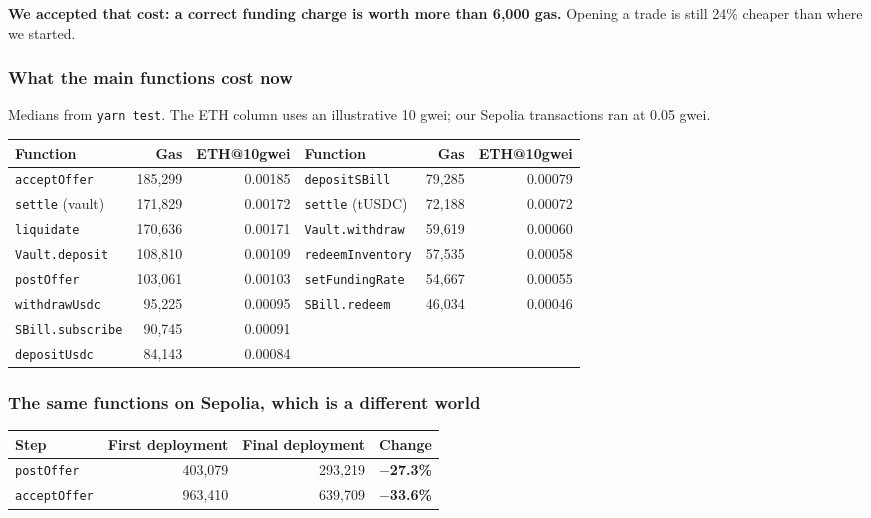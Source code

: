 \documentclass[11pt,a4paper]{article}
\begin{document}
\textbf{We accepted that cost: a correct funding charge is worth more than 6,000 gas.} Opening a
trade is still 24\% cheaper than where we started.

\subsubsection*{What the main functions cost now}

Medians from \texttt{yarn test}. The ETH column uses an illustrative 10 gwei; our Sepolia
transactions ran at 0.05 gwei.

\begin{center}
\small
\begin{tabular}{@{}lrr|lrr@{}}
\toprule
\textbf{Function} & \textbf{Gas} & \textbf{ETH@10gwei} & \textbf{Function} & \textbf{Gas} & \textbf{ETH@10gwei} \\
\midrule
\texttt{acceptOffer} & 185,299 & 0.00185 & \texttt{depositSBill} & 79,285 & 0.00079 \\
\texttt{settle} (vault) & 171,829 & 0.00172 & \texttt{settle} (tUSDC) & 72,188 & 0.00072 \\
\texttt{liquidate} & 170,636 & 0.00171 & \texttt{Vault.withdraw} & 59,619 & 0.00060 \\
\texttt{Vault.deposit} & 108,810 & 0.00109 & \texttt{redeemInventory} & 57,535 & 0.00058 \\
\texttt{postOffer} & 103,061 & 0.00103 & \texttt{setFundingRate} & 54,667 & 0.00055 \\
\texttt{withdrawUsdc} & 95,225 & 0.00095 & \texttt{SBill.redeem} & 46,034 & 0.00046 \\
\texttt{SBill.subscribe} & 90,745 & 0.00091 & & & \\
\texttt{depositUsdc} & 84,143 & 0.00084 & & & \\
\bottomrule
\end{tabular}
\end{center}

\subsubsection*{The same functions on Sepolia, which is a different world}

\begin{center}
\small
\begin{tabular}{@{}lrrr@{}}
\toprule
\textbf{Step} & \textbf{First deployment} & \textbf{Final deployment} & \textbf{Change} \\
\midrule
\texttt{postOffer} & 403,079 & 293,219 & \textbf{$-$27.3\%} \\
\texttt{acceptOffer} & 963,410 & 639,709 & \textbf{$-$33.6\%} \\
\bottomrule
\end{tabular}
\end{center}
\end{document}
